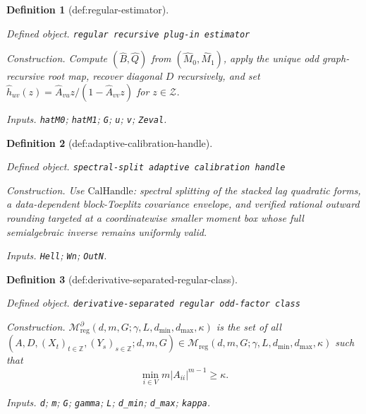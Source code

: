 \documentclass{article}
\newtheorem{definition}{Definition}
\begin{document}
\begin{definition}[def:regular-estimator]\label{def:regular-estimator}
\par\smallskip\noindent\emph{Defined object.} \texttt{regular recursive plug-\allowbreak{}in estimator}
\par\smallskip\noindent\emph{Construction.} Compute \((\widehat B,\widehat Q)\) from \((\widehat M_0,\widehat M_1)\), apply the unique odd graph-recursive root map, recover diagonal \(D\) recursively, and set \(\widehat h_{uv}(z)=\widehat A_{vu}z/(1-\widehat A_{vv}z)\) for \(z\in\mathcal Z\).
\par\smallskip\noindent\emph{Inputs.} \texttt{hatM0}; \texttt{hatM1}; \texttt{G}; \texttt{u}; \texttt{v}; \texttt{Zeval}.
\end{definition}

\begin{definition}[def:adaptive-calibration-handle]\label{def:adaptive-calibration-handle}
\par\smallskip\noindent\emph{Defined object.} \texttt{spectral-\allowbreak{}split adaptive calibration handle}
\par\smallskip\noindent\emph{Construction.} Use \(\mathrm{CalHandle}\): spectral splitting of the stacked lag quadratic forms, a data-dependent block-Toeplitz covariance envelope, and verified rational outward rounding targeted at a coordinatewise smaller moment box whose full semialgebraic inverse remains uniformly valid.
\par\smallskip\noindent\emph{Inputs.} \texttt{Hell}; \texttt{Wn}; \texttt{OutN}.
\end{definition}

\begin{definition}[def:derivative-separated-regular-class]\label{def:derivative-separated-regular-class}
\par\smallskip\noindent\emph{Defined object.} \texttt{derivative-\allowbreak{}separated regular odd-\allowbreak{}factor class}
\par\smallskip\noindent\emph{Construction.} \(\mathcal M_{\mathrm{reg}}^{\partial}(d,m,G;\gamma,L,d_{\min},d_{\max},\kappa)\) is the set of all \((A,D,(X_t)_{t\in\mathbb Z},(Y_s)_{s\in\mathbb Z};d,m,G)\in\mathcal M_{\mathrm{reg}}(d,m,G;\gamma,L,d_{\min},d_{\max},\kappa)\) such that
\[
 \min_{i\in V}m|A_{ii}|^{m-1}\ge \kappa.
\]
\par\smallskip\noindent\emph{Inputs.} \texttt{d}; \texttt{m}; \texttt{G}; \texttt{gamma}; \texttt{L}; \texttt{d\_\allowbreak{}min}; \texttt{d\_\allowbreak{}max}; \texttt{kappa}.
\end{definition}
\end{document}

